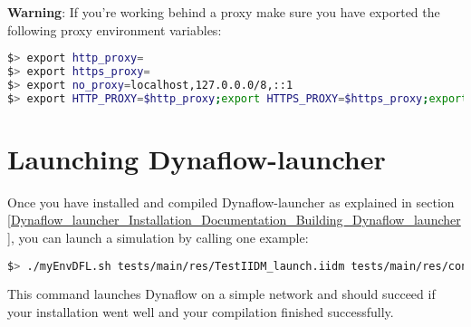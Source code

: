 \documentclass[a4paper, 12pt]{report}
\begin{document}
\textbf{Warning}: If you're working behind a proxy make sure you have exported the following proxy environment variables:

\begin{lstlisting}[language=bash]
$> export http_proxy=
$> export https_proxy=
$> export no_proxy=localhost,127.0.0.0/8,::1
$> export HTTP_PROXY=$http_proxy;export HTTPS_PROXY=$https_proxy;export NO_PROXY=$no_proxy;
\end{lstlisting}

\section[Launching Dynaflow-launcher]{Launching Dynaflow-launcher}

Once you have installed and compiled Dynaflow-launcher as explained in section \ref{Dynaflow_launcher_Installation_Documentation_Building_Dynaflow_launcher},
you can launch a simulation by calling one example:

\begin{lstlisting}[language=bash, breaklines=true, breakatwhitespace=false]
$> ./myEnvDFL.sh tests/main/res/TestIIDM_launch.iidm tests/main/res/config_launch.json
\end{lstlisting}

This command launches Dynaflow on a simple network and should succeed if your installation went well and your compilation finished successfully.
\end{document}
